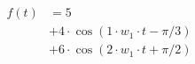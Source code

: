\correct
\begin{center}
\begin{align*}
f(t)
&= 5 \\
&+ 4 \cdot \cos( 1 \cdot w_1 \cdot t - \pi/3) \\
&+ 6 \cdot \cos( 2 \cdot w_1 \cdot t + \pi/2)
\end{align*}
\end{center}
